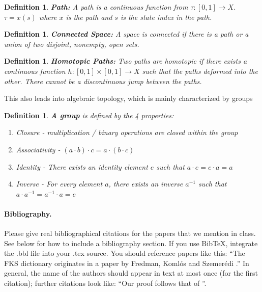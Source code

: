 \documentclass[11pt]{article}
\newtheorem{definition}[theorem]{Definition}
\begin{document}
\begin{definition}
  \textbf{Path:} A path is a continuous function from $\tau : [0, 1] \rightarrow X$.
  $\tau = x(s)$ where $x$ is the path and $s$ is the state index in the path.
\end{definition}

\begin{definition}
  \textbf{Connected Space:} A space is connected if there is a path or a union of two disjoint, nonempty, open sets.
\end{definition}
\begin{definition}
  \textbf{Homotopic Paths:} Two paths are homotopic if there exists a continuous function $h: [0, 1] \times [0, 1] \rightarrow X$
  such that the paths deformed into the other. There cannot be a discontinuous jump between the paths.
\end{definition}

This also leads into algebraic topology, which is mainly characterized by groups

\begin{definition}
  \textbf{A group} is defined by the 4 properties:
  \begin{enumerate}
    \item Closure - multiplication / binary operations are closed within the group
    \item Associativity - $(a \cdot b) \cdot c = a \cdot (b \cdot c)$
    \item Identity - There exists an identity element $e$ such that $a \cdot e = e \cdot a = a$
    \item Inverse - For every element $a$, there exists an inverse $a^{-1}$ such that $a \cdot a^{-1} = a^{-1} \cdot a = e$
  \end{enumerate}
\end{definition}


\paragraph{Bibliography.}
Please give real bibliographical citations for the papers that we
mention in class. See below for how to include a bibliography section.
If you use BibTeX, integrate the .bbl file into your .tex
source. You should reference papers like this: ``The FKS
dictionary originates in a paper by Fredman, Koml\'{o}s and
Szemer\'{e}di \cite{fks}.'' In general, the name of the authors should
appear in text at most once (for the first citation); further
citations look like: ``Our proof follows that of \cite{fks}''.
\end{document}
